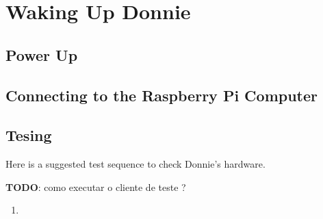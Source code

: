 \chapter{Waking Up Donnie}

\section{Power Up}
\label{sec:power}

\section{Connecting to the Raspberry Pi Computer}
\label{sec:rpi}


\section{Tesing }
\label{sec:test}

Here is a suggested test sequence to check Donnie's hardware.

{\bf TODO}: como executar o cliente de teste ?

\begin{enumerate}
\item 
\end{enumerate}


